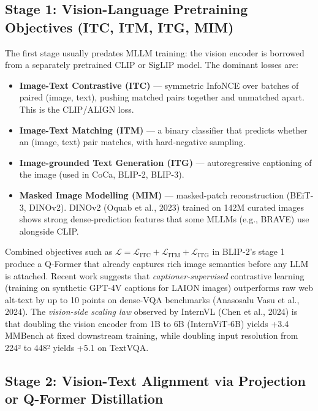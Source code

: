 \subsection{Stage 1: Vision-Language Pretraining Objectives (ITC, ITM, ITG, MIM)}\label{stage-1-vision-language-pretraining-objectives-itc-itm-itg-mim}

The first stage usually predates MLLM training: the vision encoder is borrowed from a separately pretrained CLIP or SigLIP model. The dominant losses are:

\begin{itemize}
\tightlist
\item
  \textbf{Image-Text Contrastive (ITC)} --- symmetric InfoNCE over batches of paired (image, text), pushing matched pairs together and unmatched apart. This is the CLIP/ALIGN loss.
\item
  \textbf{Image-Text Matching (ITM)} --- a binary classifier that predicts whether an (image, text) pair matches, with hard-negative sampling.
\item
  \textbf{Image-grounded Text Generation (ITG)} --- autoregressive captioning of the image (used in CoCa, BLIP-2, BLIP-3).
\item
  \textbf{Masked Image Modelling (MIM)} --- masked-patch reconstruction (BEiT-3, DINOv2). DINOv2 (Oquab et al., 2023) trained on 142M curated images shows strong dense-prediction features that some MLLMs (e.g., BRAVE) use alongside CLIP.
\end{itemize}

Combined objectives such as \(\mathcal{L} = \mathcal{L}_{\text{ITC}} + \mathcal{L}_{\text{ITM}} + \mathcal{L}_{\text{ITG}}\) in BLIP-2's stage 1 produce a Q-Former that already captures rich image semantics before any LLM is attached. Recent work suggests that \emph{captioner-supervised} contrastive learning (training on synthetic GPT-4V captions for LAION images) outperforms raw web alt-text by up to 10 points on dense-VQA benchmarks (Anasosalu Vasu et al., 2024). The \emph{vision-side scaling law} observed by InternVL (Chen et al., 2024) is that doubling the vision encoder from 1B to 6B (InternViT-6B) yields +3.4 MMBench at fixed downstream training, while doubling input resolution from 224² to 448² yields +5.1 on TextVQA.

\subsection{Stage 2: Vision-Text Alignment via Projection or Q-Former Distillation}\label{stage-2-vision-text-alignment-via-projection-or-q-former-distillation}

